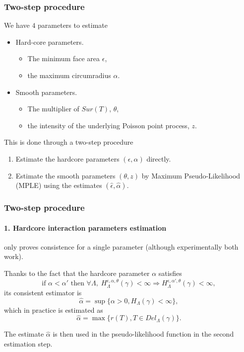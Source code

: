 \documentclass[c, 10pt]{beamer}
\begin{document}
\begin{frame}\frametitle{Two-step procedure}
\begin{small}
We have $4$ parameters to estimate
\begin{itemize}
\item Hard-core parameters.
    \begin{itemize}
    \item The minimum face area $\epsilon$,
    \item the maximum circumradius $\alpha$.
    \end{itemize}
\item Smooth parameters.
    \begin{itemize}
    \item The multiplier of $Sur(T)$, $\theta$,
    \item the intensity of the underlying Poisson point process, $z$.
    \end{itemize}
\end{itemize}
\vspace{5mm}
This is done through a \alert{two-step procedure}
\begin{enumerate}
    \item Estimate the hardcore parameters $(\epsilon, \alpha)$ directly.
    \item Estimate the smooth parameters $(\theta,z)$ by \alert{Maximum Pseudo-Likelihood} (MPLE) using the estimates $(\hat\epsilon,\hat\alpha)$.
\end{enumerate}
\end{small}


\end{frame}

\begin{frame}\frametitle{Two-step procedure}\framesubtitle{1. Hardcore interaction parameters estimation}
\begin{small}
 only proves consistence for a single parameter (although experimentally both work).\newline

Thanks to the fact that the hardcore parameter $\alpha$ satisfies
$$ \text{if } \alpha < \alpha' \text{ then  } \forall \Lambda, \; H^{\epsilon,\alpha,\theta}_\Lambda(\gamma) < \infty \Rightarrow  H^{\epsilon,\alpha',\theta}_\Lambda(\gamma)<\infty,$$ 
its consistent estimator is
$$\hat\alpha = \sup\{\alpha > 0, H_\Lambda(\gamma) < \infty \},$$
which in practice is estimated as
$$\hat\alpha = \max\{r(T), T\in Del_\Lambda(\gamma)\}.$$

The estimate $\hat\alpha$ is then used in the pseudo-likelihood function in the second estimation step.

\end{small}
\end{frame}
\end{document}
